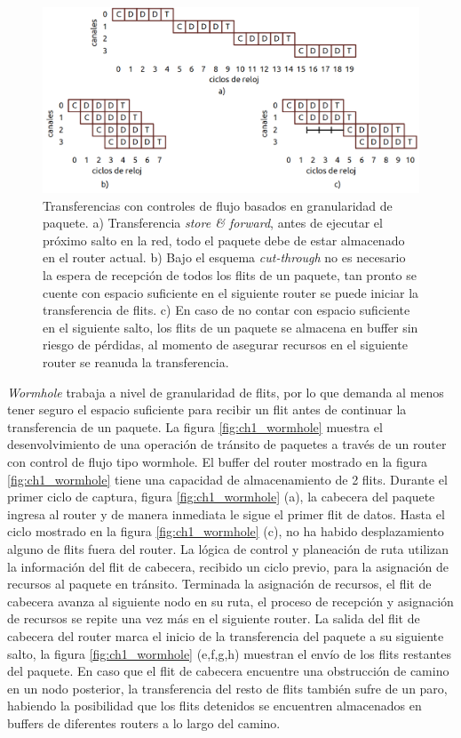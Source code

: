 \begin{figure}
	\includegraphics[width=\linewidth]{figures/ch1_store_cut.png}
	\caption
		{	
			Transferencias con controles de flujo basados en granularidad de paquete. a) Transferencia \textit{store \& forward}, antes de ejecutar el próximo salto en la red, todo el paquete debe de estar almacenado en el router actual. b) Bajo el esquema \textit{cut-through} no es necesario la espera de recepción de todos los flits de un paquete, tan pronto se cuente con espacio suficiente en el siguiente router se puede iniciar la transferencia de flits. c) En caso de no contar con espacio suficiente en el siguiente salto, los flits de un paquete se almacena en buffer sin riesgo de pérdidas, al momento de asegurar recursos en el siguiente router se reanuda la transferencia. 
		}
	\label{fig:ch1_store_cut}
\end{figure}

\textit{Wormhole} trabaja a nivel de granularidad de flits, por lo que demanda al menos tener seguro el espacio suficiente para recibir un flit antes de continuar la transferencia de un paquete. La figura \ref{fig:ch1_wormhole} muestra el desenvolvimiento de una operación de tránsito de paquetes a través de un router con control de flujo tipo wormhole. El buffer del router mostrado en la figura \ref{fig:ch1_wormhole} tiene una capacidad de almacenamiento de 2 flits. Durante el primer ciclo de captura, figura \ref{fig:ch1_wormhole} (a), la cabecera del paquete ingresa al router y de manera inmediata le sigue el primer flit de datos. Hasta el ciclo mostrado en la figura \ref{fig:ch1_wormhole} (c), no ha habido desplazamiento alguno de flits fuera del router. La lógica de control y planeación de ruta utilizan la información del flit de cabecera, recibido un ciclo previo, para la asignación de recursos al paquete en tránsito. Terminada la asignación de recursos, el flit de cabecera avanza al siguiente nodo en su ruta, el proceso de recepción y asignación de recursos se repite una vez más en el siguiente router. La salida del flit de cabecera del router marca el inicio de la transferencia del paquete a su siguiente salto, la figura \ref{fig:ch1_wormhole} (e,f,g,h) muestran el envío de los flits restantes del paquete. En caso que el flit de cabecera encuentre una obstrucción de camino en un nodo posterior, la transferencia del resto de flits también sufre de un paro, habiendo la posibilidad que los flits detenidos se encuentren almacenados en buffers de diferentes routers a lo largo del camino.

